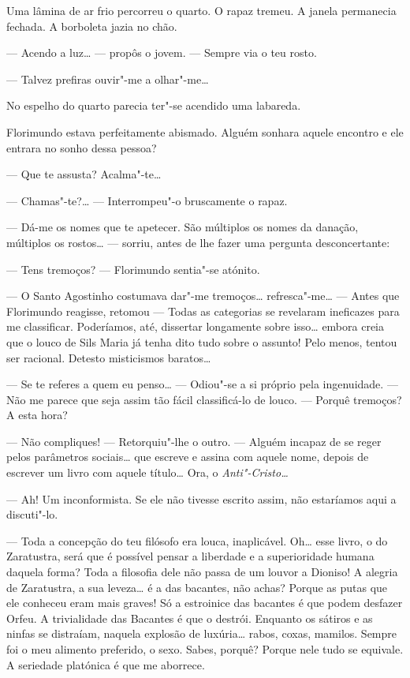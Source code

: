 Uma lâmina de ar frio percorreu o quarto. O rapaz tremeu. A janela
permanecia fechada. A borboleta jazia no chão.

--- Acendo a luz\ldots{} --- propôs o jovem. --- Sempre via o teu rosto.

--- Talvez prefiras ouvir"-me a olhar"-me\ldots{}

No espelho do quarto parecia ter"-se acendido uma labareda.

Florimundo estava perfeitamente abismado. Alguém sonhara aquele encontro
e ele entrara no sonho dessa pessoa?

--- Que te assusta? Acalma"-te\ldots{}

--- Chamas"-te?\ldots{} --- Interrompeu"-o bruscamente o rapaz.

--- Dá-me os nomes que te apetecer. São múltiplos os nomes da danação,
múltiplos os rostos\ldots{} --- sorriu, antes de lhe fazer uma pergunta
desconcertante:

--- Tens tremoços? --- Florimundo sentia"-se atónito.

--- O Santo Agostinho costumava dar"-me tremoços\ldots{} refresca"-me\ldots{} ---  Antes
que Florimundo reagisse, retomou --- Todas as categorias se revelaram
ineficazes para me classificar. Poderíamos, até, dissertar longamente
sobre isso\ldots{} embora creia que o louco de Sils Maria já tenha dito tudo
sobre o assunto! Pelo menos, tentou ser racional. Detesto misticismos
baratos\ldots{}

--- Se te referes a quem eu penso\ldots{} --- Odiou"-se a si próprio pela
ingenuidade. --- Não me parece que seja assim tão fácil classificá-lo de
louco. ---  Porquê tremoços? A esta hora?

--- Não compliques! --- Retorquiu"-lhe o outro. --- Alguém incapaz de se reger
pelos parâmetros sociais\ldots{} que escreve e assina com aquele nome, depois
de escrever um livro com aquele título\ldots{} Ora, o \emph{Anti"-Cristo\ldots{}}

--- Ah! Um inconformista. Se ele não tivesse escrito assim, não estaríamos
aqui a discuti"-lo.

--- Toda a concepção do teu filósofo era louca, inaplicável. Oh\ldots{} esse
livro, o do Zaratustra, será que é possível pensar a liberdade e a
superioridade humana daquela forma? Toda a filosofia dele não passa de
um louvor a Dioniso! A alegria de Zaratustra, a sua leveza\ldots{} é a das
bacantes, não achas? Porque as putas que ele conheceu eram mais graves!
Só a estroinice das bacantes é que podem desfazer Orfeu. A trivialidade
das Bacantes é que o destrói. Enquanto os sátiros e as ninfas se
distraíam, naquela explosão de luxúria\ldots{} rabos, coxas, mamilos. Sempre
foi o meu alimento preferido, o sexo. Sabes, porquê? Porque nele tudo se
equivale. A seriedade platónica é que me aborrece.

